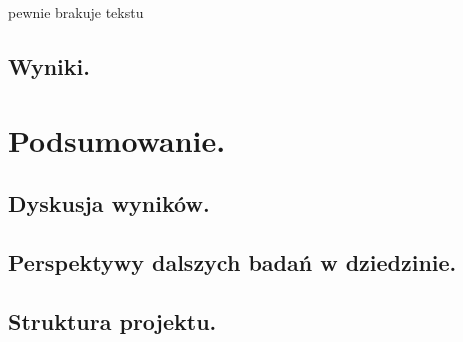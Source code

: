 \documentclass[twoside,12pt]{report}
\let\oldsection\chapter
\def\chapter{\cleardoublepage\oldsection}
\begin{document}
pewnie brakuje tekstu

\section{Wyniki.}


\chapter{Podsumowanie.}\label{rozdz.podsumowanie} 
\section{Dyskusja wyników.}


\section{Perspektywy dalszych badań w dziedzinie.}


\section{Struktura projektu.}



\listoffigures

\listoftables

\lstlistoflistings
\end{document}
